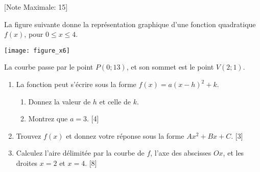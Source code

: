 \begin{question}
  \hspace*{\fill} [Note Maximale: 15]\par
  \medskip
  \begin{center} %
    \noindent La figure suivante donne la représentation graphique d'une fonction quadratique $f(x)$, pour $0 \le x \le 4$.\par
    \texttt{[image: figure\_x6]}\par
    \noindent La courbe passe par le point $P(0; 13)$, et son sommet est le point $V(2; 1)$.\par
  \end{center} %
  \begin{enumerate}[label=(\alph*)]
    \item La fonction peut s'écrire sous la forme $f(x) = a(x-h)^2 + k$.
      \begin{enumerate}[label=(\roman*)]
        \item Donnez la valeur de $h$ et celle de $k$.
        \item Montrez que $a=3$.\hspace*{\fill} [4]
      \end{enumerate}
    \item Trouvez $f(x)$ et donnez votre réponse sous la forme $Ax^2 + Bx + C$.\hspace*{\fill} [3]
    \item Calculez l'aire délimitée par la courbe de $f$, l’axe des abscisses $Ox$, et les droites $x=2$ et $x=4$.\hspace*{\fill} [8]
  \end{enumerate}
\end{question}
